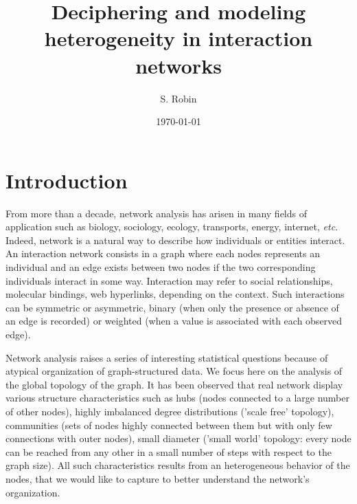 \documentclass{svmult}
\begin{document}

\title{Deciphering and modeling heterogeneity in interaction networks} 

\author{S. Robin}


\date{\today}

\maketitle

\section{Introduction}

From more than a decade, network analysis has arisen in many fields of application such as biology, sociology, ecology, transports, energy, internet, {\it etc}. Indeed, network is a natural way to describe how individuals or entities interact. An interaction network consists in a graph where each nodes represents an individual and an edge exists between two nodes if the two corresponding individuals interact in some way. Interaction may refer to social relationships, molecular bindings, web hyperlinks, depending on the context. Such interactions can be symmetric or asymmetric, binary (when only the presence or absence of an edge is recorded) or weighted (when a value is associated with each observed edge).

Network analysis raises a series of interesting statistical questions because of atypical organization of graph-structured data. We focus here on the analysis of the global topology of the graph. It has been observed that real network display various structure characteristics such as hubs (nodes connected to a large number of other nodes), highly imbalanced degree distributions ('scale free' topology), communities (sets of nodes highly connected between them but with only few connections with outer nodes), small diameter ('small world' topology: every node can be reached from any other in a small number of steps with respect to the graph size). All such characteristics results from an heterogeneous behavior of the nodes, that we would like to capture to better understand the network's organization.
\end{document}
